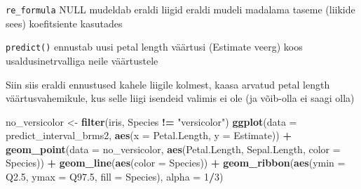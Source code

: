 \documentclass[]{book}
\newenvironment{Shaded}{\begin{snugshade}}{\end{snugshade}}
\newcommand{\KeywordTok}[1]{\textcolor[rgb]{0.13,0.29,0.53}{\textbf{#1}}}
\newcommand{\DataTypeTok}[1]{\textcolor[rgb]{0.13,0.29,0.53}{#1}}
\newcommand{\DecValTok}[1]{\textcolor[rgb]{0.00,0.00,0.81}{#1}}
\newcommand{\StringTok}[1]{\textcolor[rgb]{0.31,0.60,0.02}{#1}}
\newcommand{\CommentTok}[1]{\textcolor[rgb]{0.56,0.35,0.01}{\textit{#1}}}
\newcommand{\OtherTok}[1]{\textcolor[rgb]{0.56,0.35,0.01}{#1}}
\newcommand{\OperatorTok}[1]{\textcolor[rgb]{0.81,0.36,0.00}{\textbf{#1}}}
\newcommand{\NormalTok}[1]{#1}
\begin{document}
\texttt{re\_formula} NULL mudeldab eraldi liigid eraldi mudeli madalama
taseme (liikide sees) koefitsiente kasutades

\begin{Shaded}
\end{Shaded}

\texttt{predict()} ennustab uusi petal length väärtusi (Estimate veerg)
koos usaldusinetrvalliga neile väärtustele

Siin siis eraldi ennustused kahele liigile kolmest, kaasa arvatud petal
length väärtusvahemikule, kus selle liigi isendeid valimis ei ole (ja
võib-olla ei saagi olla)

\begin{Shaded}
\begin{Highlighting}[]
\NormalTok{no_versicolor <-}\StringTok{ }\KeywordTok{filter}\NormalTok{(iris, Species }\OperatorTok{!=}\StringTok{ "versicolor"}\NormalTok{)}
\KeywordTok{ggplot}\NormalTok{(}\DataTypeTok{data =}\NormalTok{ predict_interval_brms2, }\KeywordTok{aes}\NormalTok{(}\DataTypeTok{x =}\NormalTok{ Petal.Length, }\DataTypeTok{y =}\NormalTok{ Estimate)) }\OperatorTok{+}
\StringTok{  }\KeywordTok{geom_point}\NormalTok{(}\DataTypeTok{data =}\NormalTok{ no_versicolor, }\KeywordTok{aes}\NormalTok{(Petal.Length, Sepal.Length, }\DataTypeTok{color =}\NormalTok{ Species)) }\OperatorTok{+}
\StringTok{  }\KeywordTok{geom_line}\NormalTok{(}\KeywordTok{aes}\NormalTok{(}\DataTypeTok{color =}\NormalTok{ Species)) }\OperatorTok{+}
\StringTok{  }\KeywordTok{geom_ribbon}\NormalTok{(}\KeywordTok{aes}\NormalTok{(}\DataTypeTok{ymin =}\NormalTok{ Q2.}\DecValTok{5}\NormalTok{, }\DataTypeTok{ymax =}\NormalTok{ Q97.}\DecValTok{5}\NormalTok{, }\DataTypeTok{fill =}\NormalTok{ Species), }\DataTypeTok{alpha =} \DecValTok{1}\OperatorTok{/}\DecValTok{3}\NormalTok{)}
\end{Highlighting}
\end{Shaded}
\end{document}
